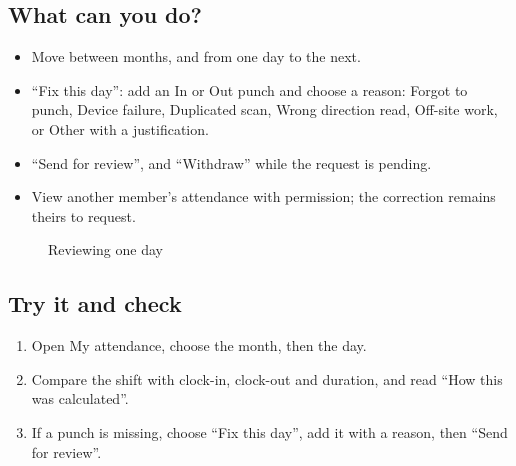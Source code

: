 \subsection{What can you do?}

\begin{itemize}
  \item Move between months, and from one day to the next.
  \item “Fix this day”: add an In or Out punch and choose a reason: Forgot to punch, Device failure, Duplicated scan, Wrong direction read, Off-site work, or Other with a justification.
  \item “Send for review”, and “Withdraw” while the request is pending.
  \item View another member's attendance with permission; the correction remains theirs to request.
\end{itemize}

\begin{figure}[H]
\centering
{}
\rclegend
\caption{Reviewing one day}
\label{fig:hr-day-review}
\end{figure}

\subsection{Try it and check}

\begin{enumerate}
  \item Open My attendance, choose the month, then the day.
  \item Compare the shift with clock-in, clock-out and duration, and read “How this was calculated”.
  \item If a punch is missing, choose “Fix this day”, add it with a reason, then “Send for review”.
\end{enumerate}

